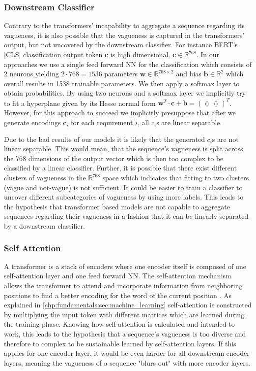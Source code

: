 \subsubsection{Downstream Classifier}
\label{chp:study:sec:interpretation:subsec:causes:downstream_classifier}
Contrary to the transformers' incapability to aggregate a sequence regarding its vagueness, it is also possible that the vagueness is captured in the transformers' output, but not uncovered by the downstream classifier.
For instance \ac{BERT}'s [CLS] classification output token $\bm{c}$ is high dimensional, $\bm{c} \in \mathbb{R}^{768}$.
In our approaches we use a single feed forward \ac{NN} for the classification which consists of 2 neurons yielding $2 \cdot 768 = 1536$ parameters $\bm{w} \in \mathbb{R}^{768 \times 2}$ and bias $\bm{b} \in \mathbb{R}^2$ which overall results in 1538 trainable parameters.
We then apply a softmax layer to obtain probabilities.
By using two neurons and a softmax layer we implicitly try to fit a hyperplane given by its Hesse normal form $ \bm{w}^T \cdot \bm{c} + \bm{b} = \begin{pmatrix} 0 & 0 \end{pmatrix}^T$.
However, for this approach to succeed we implicitly presuppose that after we generate encodings $\bm{c}_i$ for each requirement $i$, all $c_i$s are linear separable.

Due to the bad results of our models it is likely that the generated $c_i$s are not linear separable.
This would mean, that the sequence's vagueness is split across the 768 dimensions of the output vector which is then too complex to be classified by a linear classifier.
Further, it is possible that there exist different clusters of vagueness in the $\mathbb{R}^{768}$ space which indicates that fitting to two clusters (vague and not-vague) is not sufficient.
It could be easier to train a classifier to uncover different subcategories of vagueness by using more labels.
This leads to the hypothesis that transformer based models are not capable to aggregate sequences regarding their vagueness in a fashion that it can be linearly separated by a downstream classifier.

\subsubsection{Self Attention}
\label{chp:study:sec:interpretation:subsec:causes:self_attention}
A transformer is a stack of encoders where one encoder itself is composed of one self-attention layer and one feed forward \ac{NN}.
The self-attention mechanism allows the transformer to attend and incorporate information from neighboring positions to find a better encoding for the word of the current position \parencite{Vaswani:2017}.
As explained in \cref{chp:fundamentals:sec:machine_learning} self-attention is constructed by multiplying the input token with different matrices which are learned during the training phase.
Knowing how self-attention is calculated and intended to work, this leads to the hypothesis that a sequence's vagueness is too diverse and therefore to complex to be sustainable learned by self-attention layers.
If this applies for one encoder layer, it would be even harder for all downstream encoder layers, meaning the vagueness of a sequence "blurs out" with more encoder layers.
